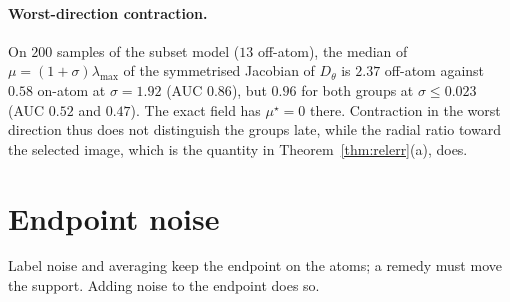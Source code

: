 \documentclass{article} %
\theoremstyle{plain}
\theoremstyle{definition}
\theoremstyle{remark}
\begin{document}
\begin{table}[h]
\centering\small
{}
\caption{The three trained models, $1000$ samples each. $C$: late contraction (medians for on- and
off-atom samples). Baseline: distance from $D_\theta$ to the nearest training image. The Heun bound
of Proposition~\ref{prop:heun} is never violated on any of them, and certifies every on-atom
sample down to $\sigma=0.30$ on all three.}
\label{tab:edm-models}
\end{table}

\paragraph{Worst-direction contraction.} On $200$ samples of the subset model ($13$ off-atom), the
median of $\mu=(1+\sigma)\lambda_{\max}$ of the symmetrised Jacobian of $D_\theta$ is $2.37$ off-atom
against $0.58$ on-atom at $\sigma=1.92$ (AUC $0.86$), but $0.96$ for both groups at
$\sigma\le0.023$ (AUC $0.52$ and $0.47$). The exact field has $\mu^\star=0$ there. Contraction in the
worst direction thus does not distinguish the groups late, while the radial ratio toward the
selected image, which is the quantity in Theorem~\ref{thm:relerr}(a), does.

\section{Endpoint noise}
\label{app:noise}

Label noise and averaging keep the endpoint on the atoms; a remedy must move the support.
Adding noise to the endpoint does so.
\end{document}
